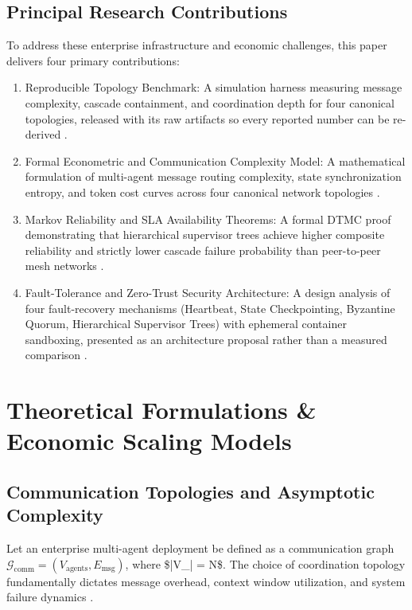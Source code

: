 \documentclass[10pt,twocolumn,letterpaper]{article}
\begin{document}
\subsection{Principal Research Contributions}


To address these enterprise infrastructure and economic challenges, this paper delivers four primary contributions:
\begin{enumerate}
  \item Reproducible Topology Benchmark: A simulation harness measuring message complexity, cascade containment, and coordination depth for four canonical topologies, released with its raw artifacts so every reported number can be re-derived \cite{crossref_10_1201_9788743808145_14}.
  \item Formal Econometric and Communication Complexity Model: A mathematical formulation of multi-agent message routing complexity, state synchronization entropy, and token cost curves across four canonical network topologies \cite{arxiv_2404_01131,arxiv_2203_08975}.
  \item Markov Reliability and SLA Availability Theorems: A formal DTMC proof demonstrating that hierarchical supervisor trees achieve higher composite reliability and strictly lower cascade failure probability than peer-to-peer mesh networks \cite{arxiv_2010_11146,arxiv_2412_06333}.
  \item Fault-Tolerance and Zero-Trust Security Architecture: A design analysis of four fault-recovery mechanisms (Heartbeat, State Checkpointing, Byzantine Quorum, Hierarchical Supervisor Trees) with ephemeral container sandboxing, presented as an architecture proposal rather than a measured comparison \cite{arxiv_2404_04289,openalex_w4400578758}.
\end{enumerate}




\section{Theoretical Formulations \& Economic Scaling Models}



\subsection{Communication Topologies and Asymptotic Complexity}


Let an enterprise multi-agent deployment be defined as a communication graph $\mathcal{G}_{\text{comm}} = (V_{\text{agents}}, E_{\text{msg}})$, where \$|V\_{}| = N\$. The choice of coordination topology fundamentally dictates message overhead, context window utilization, and system failure dynamics \cite{arxiv_2203_08975}.
\end{document}
